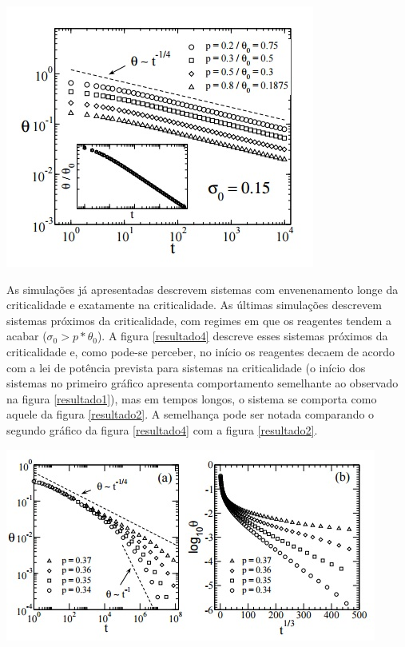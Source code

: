 { \centering
	\captionsetup{type=figure}
	\includegraphics[width=\columnwidth]{./figures/051-Resultado.jpg}\\
	\label{resultado1}
}

As simulações já apresentadas descrevem sistemas com envenenamento longe da
criticalidade e exatamente na criticalidade. As últimas simulações descrevem
sistemas próximos da criticalidade, com regimes em que os reagentes tendem a
acabar ($\sigma_0 > p*\theta_0$). A figura \ref{resultado4} descreve esses
sistemas próximos da criticalidade e, como pode-se perceber, no início os
reagentes decaem de acordo com a lei de potência prevista para sistemas na
criticalidade (o início dos sistemas no primeiro gráfico apresenta comportamento
semelhante ao observado na figura \ref{resultado1}), mas em tempos longos, o
sistema se comporta como aquele da figura \ref{resultado2}. A semelhança pode
ser notada comparando o segundo gráfico da figura \ref{resultado4} com a
figura \ref{resultado2}.

{ \centering
	\captionsetup{type=figure}
	\includegraphics[width=\columnwidth]{./figures/054-Resultado.jpg}\\
	\label{resultado4}
}
